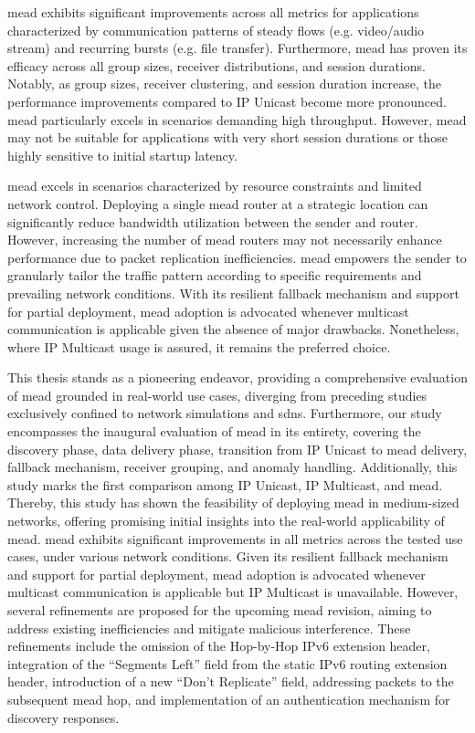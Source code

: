 \gls{mead} exhibits significant improvements across all metrics for
    applications characterized by communication patterns of steady flows
    (e.g. video/audio stream) and recurring bursts (e.g. file transfer).
Furthermore, \gls{mead} has proven its efficacy across all group sizes,
    receiver distributions, and session durations.
Notably, as group sizes, receiver clustering, and session duration increase,
    the performance improvements compared to IP Unicast become more pronounced.
\gls{mead} particularly excels in scenarios demanding high throughput.
However, \gls{mead} may not be suitable for applications with very short
    session durations or those highly sensitive to initial startup latency.

\gls{mead} excels in scenarios characterized by resource constraints and
    limited network control.
Deploying a single \gls{mead} router at a strategic location can significantly
    reduce bandwidth utilization between the sender and router.
However, increasing the number of \gls{mead} routers may not necessarily
    enhance performance due to packet replication inefficiencies.
\gls{mead} empowers the sender to granularly tailor the traffic pattern
    according to specific requirements and prevailing network conditions.
With its resilient fallback mechanism and support for partial deployment,
    \gls{mead} adoption is advocated whenever multicast communication is
    applicable given the absence of major drawbacks.
Nonetheless, where IP Multicast usage is assured, it remains the preferred
    choice.

This thesis stands as a pioneering endeavor, providing a comprehensive
    evaluation of \gls{mead} grounded in real-world use cases, diverging from 
    preceding studies exclusively confined to network simulations and
    \glspl{sdn}.
Furthermore, our study encompasses the inaugural evaluation of \gls{mead} in its
    entirety, covering the discovery phase, data delivery phase, transition
    from IP Unicast to \gls{mead} delivery, fallback mechanism, receiver
    grouping, and anomaly handling.
Additionally, this study marks the first comparison among IP Unicast, IP
    Multicast, and \gls{mead}.
Thereby, this study has shown the feasibility of deploying \gls{mead} in
    medium-sized networks, offering promising initial insights into the
    real-world applicability of \gls{mead}.
\gls{mead} exhibits significant improvements in all metrics across
    the tested use cases, under various network conditions.
Given its resilient fallback mechanism and support for partial
    deployment, \gls{mead} adoption is advocated whenever multicast
    communication is applicable but IP Multicast is unavailable.
However, several refinements are proposed for the upcoming \gls{mead}
    revision, aiming to address existing inefficiencies and mitigate malicious
    interference.
These refinements include the omission of the Hop-by-Hop IPv6 extension header,
    integration of the ``Segments Left'' field from the static IPv6 routing
    extension header, introduction of a new ``Don't Replicate'' field,
    addressing packets to the subsequent \gls{mead} hop, and implementation of
    an authentication mechanism for discovery responses.


